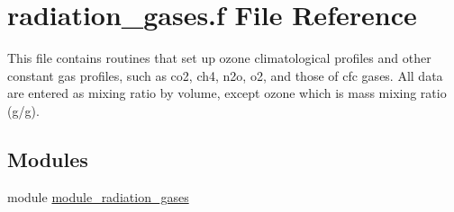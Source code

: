 \hypertarget{radiation__gases_8f}{}\section{radiation\+\_\+gases.\+f File Reference}
\label{radiation__gases_8f}


This file contains routines that set up ozone climatological profiles and other constant gas profiles, such as co2, ch4, n2o, o2, and those of cfc gases. All data are entered as mixing ratio by volume, except ozone which is mass mixing ratio (g/g).  


\subsection*{Modules}
\begin{DoxyCompactItemize}
\item 
module \hyperlink{namespacemodule__radiation__gases}{module\+\_\+radiation\+\_\+gases}
\end{DoxyCompactItemize}
